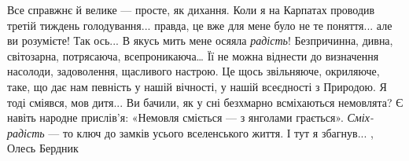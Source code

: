Все справжнє й велике — просте, як дихання. Коли я на Карпатах проводив третій
тиждень голодування... правда, це вже для мене було не те поняття... але ви
розумієте! Так ось... В якусь мить мене осяяла \emph{радість}! Безпричинна,
дивна, світозарна, потрясаюча, всепроникаюча… Її не можна віднести до
визначення насолоди, задоволення, щасливого настрою. Це щось звільняюче,
окриляюче, таке, що дає нам певність у нашій вічності, у нашій всеєдності з
Природою. Я тоді сміявся, мов дитя... Ви бачили, як у сні безхмарно всміхаються
немовлята? Є навіть народне прислів’я: «Немовля сміється — з янголами
грається».  \emph{Сміх-радість} — то ключ до замків усього вселенського життя.
І тут я збагнув...
, Олесь Бердник
